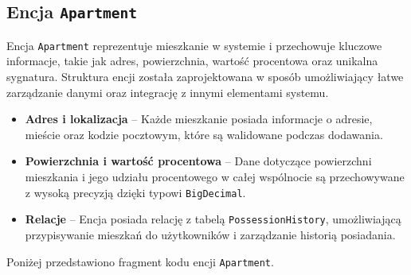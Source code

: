 \subsection{Encja \texttt{Apartment}}

Encja \texttt{Apartment} reprezentuje mieszkanie w systemie i przechowuje kluczowe informacje, takie jak adres, powierzchnia, wartość procentowa oraz unikalna sygnatura. Struktura encji została zaprojektowana w sposób umożliwiający łatwe zarządzanie danymi oraz integrację z innymi elementami systemu.

\begin{itemize}
    \item \textbf{Adres i lokalizacja} -- Każde mieszkanie posiada informacje o adresie, mieście oraz kodzie pocztowym, które są walidowane podczas dodawania.
    \item \textbf{Powierzchnia i wartość procentowa} -- Dane dotyczące powierzchni mieszkania i jego udziału procentowego w całej wspólnocie są przechowywane z wysoką precyzją dzięki typowi \texttt{BigDecimal}.
    \item \textbf{Relacje} -- Encja posiada relację z tabelą \texttt{PossessionHistory}, umożliwiającą przypisywanie mieszkań do użytkowników i zarządzanie historią posiadania.
\end{itemize}

\noindent Poniżej przedstawiono fragment kodu encji \texttt{Apartment}.

